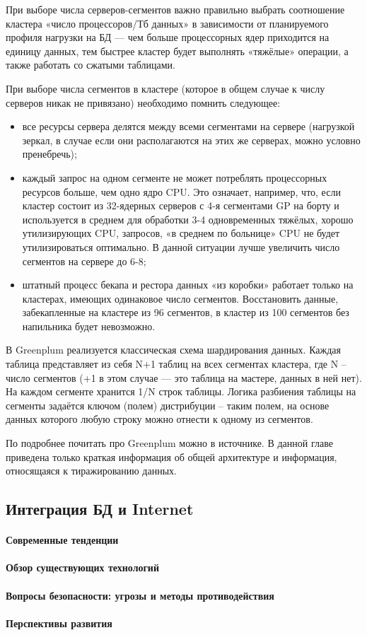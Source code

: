 При выборе числа серверов-сегментов важно правильно выбрать соотношение кластера «число процессоров/Тб данных» в
зависимости от планируемого профиля нагрузки на БД — чем больше процессорных ядер приходится на единицу данных, тем
быстрее кластер будет выполнять «тяжёлые» операции, а также работать со сжатыми таблицами.

При выборе числа сегментов в кластере (которое в общем случае к числу серверов никак не привязано) необходимо помнить
следующее:
\begin{itemize}
    \item все ресурсы сервера делятся между всеми сегментами на сервере (нагрузкой зеркал, в случае если они располагаются на этих же серверах, можно условно пренебречь);
    \item каждый запрос на одном сегменте не может потреблять процессорных ресурсов больше, чем одно ядро CPU. Это означает, например, что, если кластер состоит из 32-ядерных серверов с 4-я сегментами GP на борту и используется в среднем для обработки 3-4 одновременных тяжёлых, хорошо утилизирующих CPU, запросов, «в среднем по больнице» CPU не будет утилизироваться оптимально. В данной ситуации лучше увеличить число сегментов на сервере до 6-8;
    \item штатный процесс бекапа и рестора данных «из коробки» работает только на кластерах, имеющих одинаковое число сегментов. Восстановить данные, забекапленные на кластере из 96 сегментов, в кластер из 100 сегментов без напильника будет невозможно.
\end{itemize}

В Greenplum реализуется классическая схема шардирования данных. Каждая таблица представляет из себя N+1 таблиц на всех
сегментах кластера, где N – число сегментов (+1 в этом случае — это таблица на мастере, данных в ней нет). На каждом
сегменте хранится 1/N строк таблицы. Логика разбиения таблицы на сегменты задаётся ключом (полем) дистрибуции – таким
полем, на основе данных которого любую строку можно отнести к одному из сегментов.

По подробнее почитать про Greenplum можно в источнике. В данной главе приведена только краткая информация об общей
архитектуре и информация, относящаяся к тиражированию данных. \autocite{Greenplum}

\subsection{Интеграция БД и Internet}
\paragraph{Современные тенденции}
\paragraph{Обзор существующих технологий}
\paragraph{Вопросы безопасности: угрозы и методы противодействия}
\paragraph{Перспективы развития}